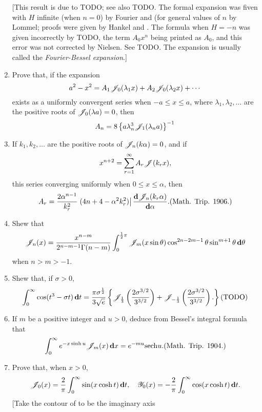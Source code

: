 \documentclass{book}
\begin{document}
\begin{enumerate}
  [This result is due to TODO; see also TODO. The formal expansion was
  fiven with $H$ infinite (when $n=0$) by Fourier and (for general
  values of $n$ by Lommel; proofs were given by Hankel and \Schlafli.
  The formula when $H = -n$ was given incorrectly by TODO, the term
  $A_{0}x^{n}$ being printed as $A_{0}$, and this error was not
  corrected by Nielsen. See TODO. The expansion is usually called the
  \emph{Fourier-Bessel expansion}.]
\item
  Prove that, if the expansion
  $$
  a^{2} - x^{2}
  =
  A_{1} \mathscr{J}_{0}(\lambda_{1} x)
  + A_{2} \mathscr{J}_{0}(\lambda_{2} x)
  + \cdots
  $$
  exists as a uniformly convergent series when
  $ -a \leq x \leq a$, where $\lambda_{1}, \lambda_{2}, \ldots$ are
  the positive roots of $\mathscr{J}_{0}(\lambda a)=0$, then
  $$
  A_{n} = 8 \left\{  a \lambda_{n}^{3} \mathscr{J}_{1}(\lambda_{n} a) \right\}^{-1}
  $$
\item
  If $k_{1}, k_{2}, \ldots$ are the positive roots of
  $\mathscr{J}_{n}(k\alpha) = 0$, and if
  $$
  x^{n+2} = \sum_{r=1}^{\infty} A_{r} \mathscr{J}(k_{r}x),
  $$
  this series converging uniformly when $0 \leq x \leq \alpha$, then
  $$
  A_{r}
  =
  \frac{2 \alpha^{n-1}}{k_{r}^{2}}
  \left.
    (4n + 4 - \alpha^{2}k_{r}^{2})
  \right|
  \frac{\dd \besJ_{n}(k_{r}\alpha)}{\dd \alpha}.
  \addexamplecitation{Math. Trip. 1906.}
  $$
\item
  Shew that
  $$
  \mathscr{J}_{n}(x)
  =
  \frac{x^{n-m}}{2^{n-m-1}\Gamma(n-m)}
  \int_{0}^{\frac{1}{2} \pi}
  \mathscr{J}_{m}(x\sin\theta)
  \cos^{2n-2m-1}\theta
  \sin^{m+1}\theta
  \, \mathbf{d} \theta
  $$
  when $n>m>-1$.
\item
  Shew that, if $\sigma>0$,
  $$
  \int_{0}^{\infty}
  \cos(t^{3} - \sigma t) \dmeasure t
  =
  \frac{\pi \sigma^{\half}}{3\sqrt{e}}
  \thebrace{
    \besJ_{\frac{1}{3}} \theparen{\frac{2 \sigma^{3/2}}{3^{3/2}}}
    +
    \besJ_{-\frac{1}{3}} \theparen{\frac{2 \sigma^{3/2}}{3^{3/2}}}.
  }
  \addexamplecitation{TODO}
  $$
\item
  If $m$ be a positive integer and $u>0$, deduce from Bessel's
  integral formula that
  $$
  \int_{0}^{\infty}
  e^{-x \sinh u} \besJ_{m}(x) \dmeasure x
  =
  e^{-mu} \sech u.
  \addexamplecitation{Math. Trip. 1904.}
  $$
\item
  Prove that, when $x>0$,
  $$
  \mathscr{J}_{0}(x) = \frac{2}{\pi} \int_{0}^{\infty} \sin(x \cosh t)
  \, \mathbf{d} t,
  \quad
  \mathscr{Y}_{0}(x) = -\frac{2}{\pi}
  \int_{0}^{\infty} \cos(x \cosh t)
  \, \mathbf{d} t.
  $$
  [Take the contour of  to be the imaginary axis

\end{enumerate}
\end{document}
